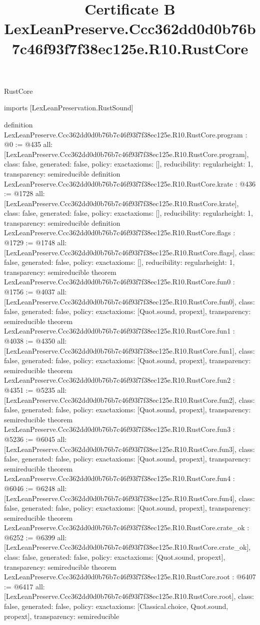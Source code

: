 \begin{lexlean}{RustCore}
\title{Certificate B LexLeanPreserve.Ccc362dd0d0b76b7c46f93f7f38ec125e.R10.RustCore}
\begin{coremodule}
imports [LexLeanPreservation.RustSound]

definition LexLeanPreserve.Ccc362dd0d0b76b7c46f93f7f38ec125e.R10.RustCore.program : @0 := @435 {
  all: [LexLeanPreserve.Ccc362dd0d0b76b7c46f93f7f38ec125e.R10.RustCore.program],
  class: false,
  generated: false,
  policy: exact{axioms: []},
  reducibility: regular{height: 1},
  transparency: semireducible
}
definition LexLeanPreserve.Ccc362dd0d0b76b7c46f93f7f38ec125e.R10.RustCore.krate : @436 := @1728 {
  all: [LexLeanPreserve.Ccc362dd0d0b76b7c46f93f7f38ec125e.R10.RustCore.krate],
  class: false,
  generated: false,
  policy: exact{axioms: []},
  reducibility: regular{height: 1},
  transparency: semireducible
}
definition LexLeanPreserve.Ccc362dd0d0b76b7c46f93f7f38ec125e.R10.RustCore.flags : @1729 := @1748 {
  all: [LexLeanPreserve.Ccc362dd0d0b76b7c46f93f7f38ec125e.R10.RustCore.flags],
  class: false,
  generated: false,
  policy: exact{axioms: []},
  reducibility: regular{height: 1},
  transparency: semireducible
}
theorem LexLeanPreserve.Ccc362dd0d0b76b7c46f93f7f38ec125e.R10.RustCore.fun0 : @1756 := @4037 {
  all: [LexLeanPreserve.Ccc362dd0d0b76b7c46f93f7f38ec125e.R10.RustCore.fun0],
  class: false,
  generated: false,
  policy: exact{axioms: [Quot.sound, propext]},
  transparency: semireducible
}
theorem LexLeanPreserve.Ccc362dd0d0b76b7c46f93f7f38ec125e.R10.RustCore.fun1 : @4038 := @4350 {
  all: [LexLeanPreserve.Ccc362dd0d0b76b7c46f93f7f38ec125e.R10.RustCore.fun1],
  class: false,
  generated: false,
  policy: exact{axioms: [Quot.sound, propext]},
  transparency: semireducible
}
theorem LexLeanPreserve.Ccc362dd0d0b76b7c46f93f7f38ec125e.R10.RustCore.fun2 : @4351 := @5235 {
  all: [LexLeanPreserve.Ccc362dd0d0b76b7c46f93f7f38ec125e.R10.RustCore.fun2],
  class: false,
  generated: false,
  policy: exact{axioms: [Quot.sound, propext]},
  transparency: semireducible
}
theorem LexLeanPreserve.Ccc362dd0d0b76b7c46f93f7f38ec125e.R10.RustCore.fun3 : @5236 := @6045 {
  all: [LexLeanPreserve.Ccc362dd0d0b76b7c46f93f7f38ec125e.R10.RustCore.fun3],
  class: false,
  generated: false,
  policy: exact{axioms: [Quot.sound, propext]},
  transparency: semireducible
}
theorem LexLeanPreserve.Ccc362dd0d0b76b7c46f93f7f38ec125e.R10.RustCore.fun4 : @6046 := @6248 {
  all: [LexLeanPreserve.Ccc362dd0d0b76b7c46f93f7f38ec125e.R10.RustCore.fun4],
  class: false,
  generated: false,
  policy: exact{axioms: [Quot.sound, propext]},
  transparency: semireducible
}
theorem LexLeanPreserve.Ccc362dd0d0b76b7c46f93f7f38ec125e.R10.RustCore.crate_ok : @6252 := @6399 {
  all: [LexLeanPreserve.Ccc362dd0d0b76b7c46f93f7f38ec125e.R10.RustCore.crate_ok],
  class: false,
  generated: false,
  policy: exact{axioms: [Quot.sound, propext]},
  transparency: semireducible
}
theorem LexLeanPreserve.Ccc362dd0d0b76b7c46f93f7f38ec125e.R10.RustCore.root : @6407 := @6417 {
  all: [LexLeanPreserve.Ccc362dd0d0b76b7c46f93f7f38ec125e.R10.RustCore.root],
  class: false,
  generated: false,
  policy: exact{axioms: [Classical.choice, Quot.sound, propext]},
  transparency: semireducible
}


\end{coremodule}
\end{lexlean}
